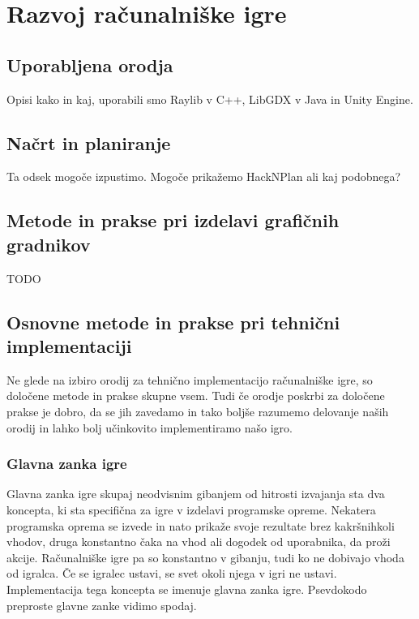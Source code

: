 \documentclass[12pt,a4paper,twoside]{book}
\begin{document}
\chapter{Razvoj računalniške igre}\thispagestyle{fancy}
\label{chapter:razvojIger}
\section{Uporabljena orodja}
Opisi kako in kaj, uporabili smo Raylib v C++, LibGDX v Java in Unity Engine.

\section{Načrt in planiranje}
Ta odsek mogoče izpustimo. Mogoče prikažemo HackNPlan ali kaj podobnega?
\section{Metode in prakse pri izdelavi grafičnih gradnikov}
TODO

\section{Osnovne metode in prakse pri tehnični implementaciji}
Ne glede na izbiro orodij za tehnično implementacijo računalniške igre, so določene metode in prakse skupne vsem. Tudi če orodje poskrbi za določene prakse je dobro, da se jih zavedamo in tako boljše razumemo delovanje naših orodij in lahko bolj učinkovito implementiramo našo igro.

\subsection{Glavna zanka igre}
Glavna zanka igre skupaj neodvisnim gibanjem od hitrosti izvajanja sta dva koncepta, ki sta specifična za igre v izdelavi programske opreme. Nekatera programska oprema se izvede in nato prikaže svoje rezultate brez kakršnihkoli vhodov, druga konstantno čaka na vhod ali dogodek od uporabnika, da proži akcije. Računalniške igre pa so konstantno v gibanju, tudi ko ne dobivajo vhoda od igralca. Če se igralec ustavi, se svet okoli njega v igri ne ustavi. Implementacija tega koncepta se imenuje glavna zanka igre. Psevdokodo preproste glavne zanke vidimo spodaj.
\end{document}
